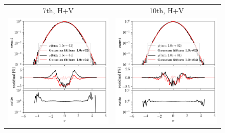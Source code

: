 \documentclass[
prstab
,reprint
,linenumbers
,longbibliography
,preprintnumbers
,showkeys
,amsfonts,amssymb,amsmath
,floatfix
]{revtex4-1}
\newlength{\bsrtwidth}
\begin{document}
\begin{figure}
\begin{tabular}{cc}
    7th, H+V & 10th, H+V \\
    \includegraphics[width=\bsrtwidth]{2016injerra2b2u_t7skhv_3_5um_hist_x.png}
                  &
    \includegraphics[width=\bsrtwidth]{2016injerra2b2u_t10skhv_3_5um_hist_y.png} \\

\end{tabular}
\end{figure}
\end{document}
